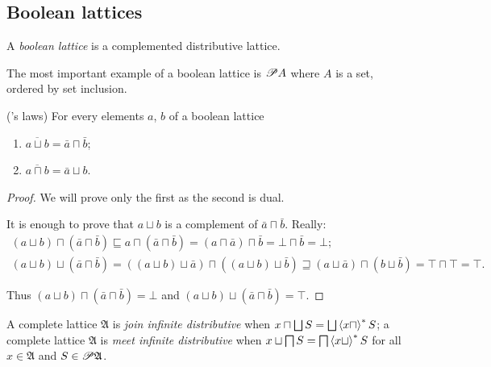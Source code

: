\subsection{Boolean lattices}
\begin{defn}
A \emph{boolean lattice} is a complemented
distributive lattice.
\end{defn}
The most important example of a boolean lattice is $\mathscr{P} A$ where
\textbf{$A$} is a set, ordered by set inclusion.
\begin{thm}
('s laws) For every elements $a$,
$b$ of a boolean lattice
\begin{enumerate}
\item $\overline{a\sqcup b}=\bar{a}\sqcap\bar{b}$;
\item $\overline{a\sqcap b}=\bar{a}\sqcup b$.
\end{enumerate}
\end{thm}
\begin{proof}
We will prove only the first as the second is dual.

It is enough to prove that $a\sqcup b$ is a complement of $\bar{a}\sqcap\bar{b}$.
Really:
\begin{gather*}
(a\sqcup b)\sqcap(\bar{a}\sqcap\bar{b})\sqsubseteq a\sqcap(\bar{a}\sqcap\bar{b})=(a\sqcap\bar{a})\sqcap\bar{b}=\bot\sqcap\bar{b}=\bot;\\
(a\sqcup b)\sqcup(\bar{a}\sqcap\bar{b})=((a\sqcup b)\sqcup\bar{a})\sqcap((a\sqcup b)\sqcup\bar{b})\sqsupseteq(a\sqcup\bar{a})\sqcap(b\sqcup\bar{b})=\top\sqcap\top=\top.
\end{gather*}


Thus $(a\sqcup b)\sqcap(\bar{a}\sqcap\bar{b})=\bot$ and $(a\sqcup b)\sqcup(\bar{a}\sqcap\bar{b})=\top$.\end{proof}
\begin{defn}
A complete lattice $\mathfrak{A}$
is \emph{join infinite distributive} when $x\sqcap\bigsqcup S=\bigsqcup\left\langle x\sqcap\right\rangle ^{\ast}S$;
a complete lattice $\mathfrak{A}$
is \emph{meet infinite distributive} when $x\sqcup\bigsqcap S=\bigsqcap\left\langle x\sqcup\right\rangle ^{\ast}S$
for all $x\in\mathfrak{A}$ and $S\in\mathscr{P}\mathfrak{A}$.
\end{defn}

